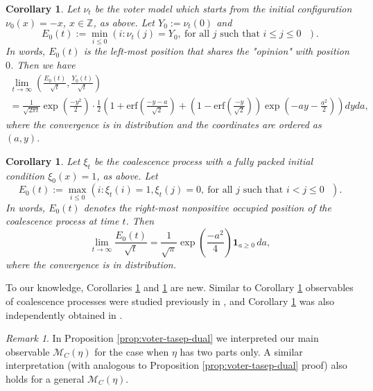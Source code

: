 \documentclass[11pt,reqno]{amsart}
\newtheorem{cor}[thm]{Corollary}
\theoremstyle{definition}
\theoremstyle{remark}
\newtheorem{rmk}[thm]{Remark}
\theoremstyle{remark}
\def\leq{\leqslant}
\def\geq{\geqslant}
\renewcommand\le{\leq}
\renewcommand\ge{\geq}
\def\Z{\mathbb Z}
\def\M{\mathcal M}
\numberwithin{equation}{section}
\begin{document}
	\begin{cor}
		\label{cor:asymp-voter}
		Let $\nu_t$ be the voter model which starts from the initial configuration $\nu_0 (x)= -x$, $x \in \Z$, as above. Let $Y_0:= \nu_t (0)$ and  
		$$
		E_0 (t) := \min_{i \le 0} \left(i: \nu_t \left( j \right) =Y_0, \ \mbox{for all $j$ such that $i \le j \le 0$ } \right).
		$$
		In words, $E_0 (t)$ is the left-most position that shares the "opinion" with position $0$. 
		Then we have
		\begin{multline*}
			\lim_{t \to \infty} \left( \frac{E_0(t)}{\sqrt{t}}, \frac{Y_0(t)}{\sqrt{t}}  \right)
			\\ =
			\frac{1}{\sqrt{2 \pi t}} \exp \left( \frac{-y^2}{2} \right) \cdot \frac{1}{2} \left( 1 + \mathrm{erf} \left( \frac{-y-a}{\sqrt{2}} \right) + \left( 1 - \mathrm{erf} \left( \frac{-y}{\sqrt{2}} \right) \right) \exp \left( - a y - \frac{a^2}{2} \right) \right) dy da,
		\end{multline*}
		where the convergence is in distribution and the coordinates are ordered as $(a,y)$. 
	\end{cor}
	
	\begin{cor}
		\label{cor:coalescence}
		Let $\xi_t$ be the coalescence process with a fully packed initial condition $\xi_0 (x)=1$, as above. Let 
		$$
		E_0 (t) := \max_{i \le 0} \left(i: \xi_t \left( i \right) =1, \xi_t \left( j \right) =0, \ \mbox{for all $j$ such that $i < j \le 0$ } \right).
		$$
		In words, $E_0(t)$ denotes the right-most nonpositive occupied position of the coalescence process at time $t$. 
		Then
		$$
		\lim_{t \to \infty} \frac{E_0(t)}{\sqrt{t}} = \frac{1}{\sqrt{\pi}} \exp \left( \frac{-a^2}{4} \right) \mathbf{1}_{a \ge 0} \, da,
		$$
		where the convergence is in distribution. 
	\end{cor}
	
	To our knowledge, Corollaries \ref{cor:asymp-voter} and \ref{cor:coalescence} are new. 
	Similar to Corollary \ref{cor:coalescence} observables of coalescence processes were studied previously in \cite{TZ11}, and Corollary \ref{cor:coalescence} was also independently obtained in \cite{TZ}. 
	
	\begin{rmk}
		In Proposition \ref{prop:voter-tasep-dual} we interpreted our main observable $\M_C(\eta)$ for the case when $\eta$ has two parts only. A similar interpretation (with analogous to Proposition \ref{prop:voter-tasep-dual} proof) also holds for a general $\M_C(\eta)$. 
	\end{rmk}
	
\end{document}
